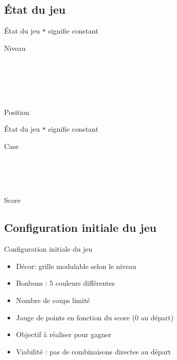 \subsection{État du jeu}
\begin{frame}{État du jeu}
	{\texttt{*} signifie constant}
	\begin{typeag}{Niveau}
		\\
		\\
		\\
		\\
	\end{typeag}
	~\\
	\begin{typeag}{Position}
		\\
	\end{typeag}
\end{frame}

\begin{frame}{État du jeu}
	{\texttt{*} signifie constant}
	\begin{typeag}{Case}
		\\
		\\
		\\
	\end{typeag}
	~\\
	\begin{typeag}{Score}
		\\
	\end{typeag}
\end{frame}

\subsection{Configuration initiale du jeu}
\begin{frame}{Configuration initiale du jeu}
	\begin{itemize}
		\item
			Décor: grille modulable selon le niveau
		\item
			Bonbons : 5 couleurs différentes
		\item
			Nombre de coups limité
		\item
			Jauge de points en fonction du score (0 au départ)
		\item
			Objectif à réaliser pour gagner
		\item 
			Viabilité : pas de combinaisons directes au départ
	\end{itemize}
\end{frame}


